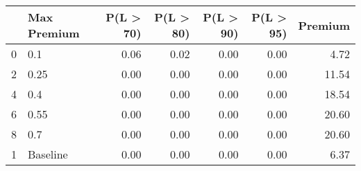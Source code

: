 \begin{tabular}{llrrrrr}
\toprule
{} & Max Premium &  P(L > 70) &  P(L > 80) &  P(L > 90) &  P(L > 95) &  Premium \\
\midrule
0 &         0.1 &       0.06 &       0.02 &       0.00 &       0.00 &     4.72 \\
2 &        0.25 &       0.00 &       0.00 &       0.00 &       0.00 &    11.54 \\
4 &         0.4 &       0.00 &       0.00 &       0.00 &       0.00 &    18.54 \\
6 &        0.55 &       0.00 &       0.00 &       0.00 &       0.00 &    20.60 \\
8 &         0.7 &       0.00 &       0.00 &       0.00 &       0.00 &    20.60 \\
1 &    Baseline &       0.00 &       0.00 &       0.00 &       0.00 &     6.37 \\
\bottomrule
\end{tabular}
